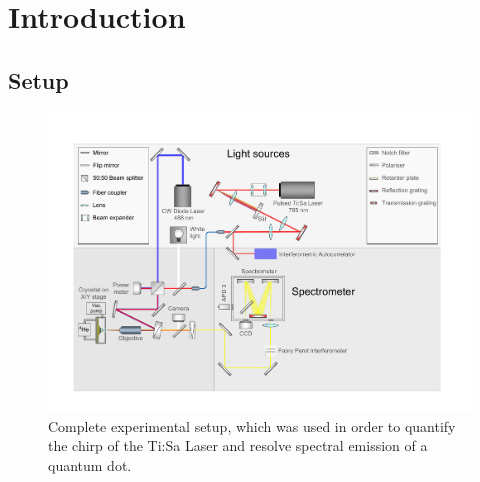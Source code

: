 \chapter{Introduction}

\section{Setup}

\begin{figure}[H]
	\centering
	\includegraphics[width=1.2\linewidth]{figures/setup/Setup_flat}
	\caption{Complete experimental setup, which was used in order to quantify the chirp of the Ti:Sa Laser and resolve spectral emission of a quantum dot.}
	\label{fig:setupflat}
\end{figure}
